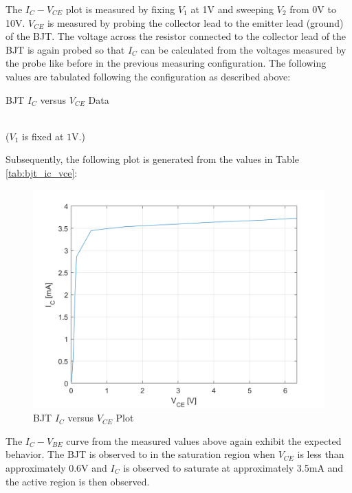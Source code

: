 The $I_C - V_{CE}$ plot is measured by fixing $V_1$ at 1V and sweeping $V_2$ from 0V to 10V. $V_{CE}$ is measured by probing the collector lead to the emitter lead (ground) of the BJT. The voltage across the resistor connected to the collector lead of the BJT is again probed so that $I_C$ can be calculated from the voltages measured by the probe like before in the previous measuring configuration. The following values are tabulated following the configuration as described above:

\FloatBarrier

\begin{table}[h!]
	\centering
	\caption{BJT $I_C$ versus $V_{CE}$ Data}
	\label{tab:bjt_ic_vce}
	\\
	(\footnotesize $V_1$ is fixed at $1$\si{\volt}.)
\end{table}



\FloatBarrier

Subsequently, the following plot is generated from the values in Table \ref{tab:bjt_ic_vce}:

\FloatBarrier

\begin{figure}[h!]
	\centering
	\includegraphics[scale=0.4]{../images/bjt_ic_vce.PNG}
	\caption{BJT $I_C$ versus $V_{CE}$ Plot}
	\label{fig:bjt_ic_vce}
\end{figure}

\FloatBarrier

The $I_C - V_{BE}$ curve from the measured values above again exhibit the expected behavior. The BJT is observed to in the saturation region when $V_{CE}$ is less than approximately 0.6V and $I_C$ is observed to saturate at approximately 3.5mA and the active region is then observed. 